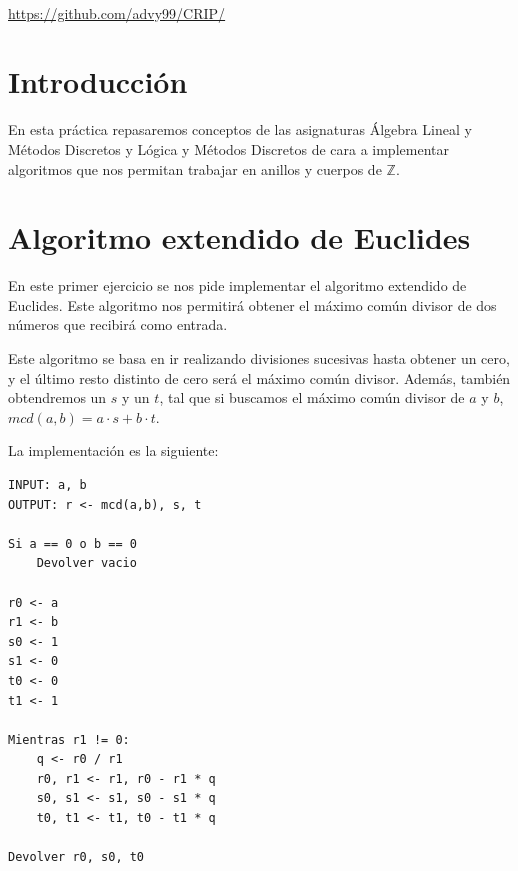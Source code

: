 \documentclass[12pt, spanish]{article}
\makeatletter
\let\thedate\@date
\makeatother
\begin{document}
\begin{titlepage}
    {\large \thedate}\\[0.5cm]
    {\url{https://github.com/advy99/CRIP/}}
    {\doclicenseThis}

    \vfill

\end{titlepage}


\tableofcontents
\pagebreak



\section*{Introducción}

En esta práctica repasaremos conceptos de las asignaturas Álgebra Lineal y Métodos Discretos y Lógica y Métodos Discretos de cara a implementar algoritmos que nos permitan trabajar en anillos y cuerpos de $\mathbb{Z}$.

\section{Algoritmo extendido de Euclides}

En este primer ejercicio se nos pide implementar el algoritmo extendido de Euclides. Este algoritmo nos permitirá obtener el máximo común divisor de dos números que recibirá como entrada.

Este algoritmo se basa en ir realizando divisiones sucesivas hasta obtener un cero, y el último resto distinto de cero será el máximo común divisor. Además, también obtendremos un $s$ y un $t$, tal que si buscamos el máximo común divisor de $a$ y $b$, $mcd(a, b) = a \cdot s + b \cdot t$.

La implementación es la siguiente:

\begin{lstlisting}[caption={Algoritmo extendido de Euclides}]
INPUT: a, b
OUTPUT: r <- mcd(a,b), s, t

Si a == 0 o b == 0
	Devolver vacio

r0 <- a
r1 <- b
s0 <- 1
s1 <- 0
t0 <- 0
t1 <- 1

Mientras r1 != 0:
	q <- r0 / r1
	r0, r1 <- r1, r0 - r1 * q
	s0, s1 <- s1, s0 - s1 * q
	t0, t1 <- t1, t0 - t1 * q

Devolver r0, s0, t0
\end{lstlisting}
\end{document}
